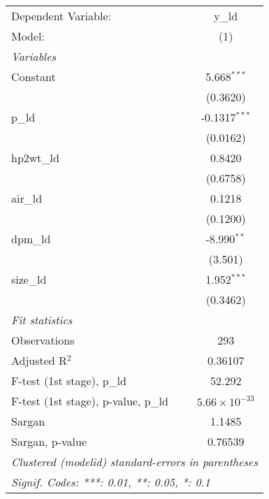 
\begingroup
\centering
\begin{tabular}{lc}
   \tabularnewline \midrule \midrule
   Dependent Variable:                 & y\_ld\\   
   Model:                              & (1)\\  
   \midrule
   \emph{Variables}\\
   Constant                            & 5.668$^{***}$\\   
                                       & (0.3620)\\   
   p\_ld                               & -0.1317$^{***}$\\   
                                       & (0.0162)\\   
   hp2wt\_ld                           & 0.8420\\   
                                       & (0.6758)\\   
   air\_ld                             & 0.1218\\   
                                       & (0.1200)\\   
   dpm\_ld                             & -8.990$^{**}$\\   
                                       & (3.501)\\   
   size\_ld                            & 1.952$^{***}$\\   
                                       & (0.3462)\\   
   \midrule
   \emph{Fit statistics}\\
   Observations                        & 293\\  
   Adjusted R$^2$                      & 0.36107\\  
   F-test (1st stage), p\_ld           & 52.292\\  
   F-test (1st stage), p-value, p\_ld  & $5.66\times 10^{-33}$\\   
   Sargan                              & 1.1485\\  
   Sargan, p-value                     & 0.76539\\  
   \midrule \midrule
   \multicolumn{2}{l}{\emph{Clustered (modelid) standard-errors in parentheses}}\\
   \multicolumn{2}{l}{\emph{Signif. Codes: ***: 0.01, **: 0.05, *: 0.1}}\\
\end{tabular}
\par\endgroup


